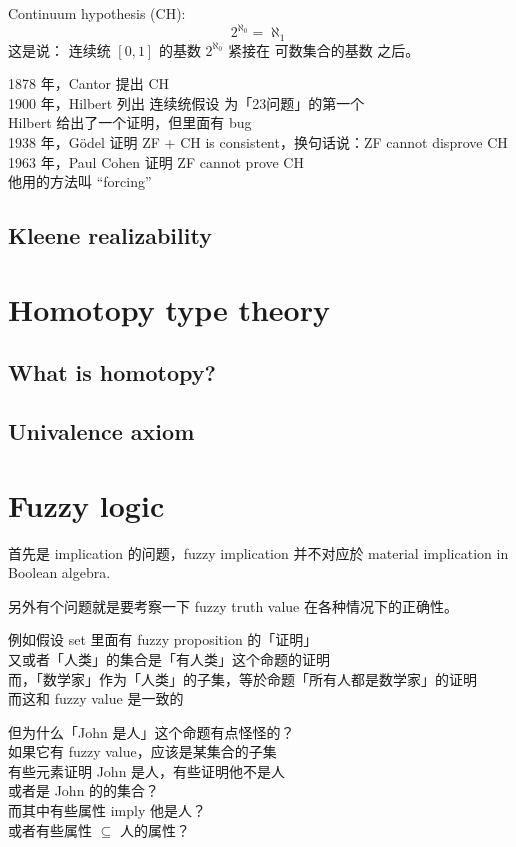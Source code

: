 Continuum hypothesis (CH):
\begin{equation}
2^{\aleph_0} = \aleph_1
\end{equation}
这是说： 连续统 $[0,1]$ 的基数 $2^{\aleph_0}$ 紧接在 可数集合的基数 之后。

1878 年，Cantor 提出 CH \\
1900 年，Hilbert 列出 连续统假设 为「23问题」的第一个 \\
\tab Hilbert 给出了一个证明，但里面有 bug \\
1938 年，G\"{o}del 证明 ZF + CH is consistent，换句话说：ZF cannot disprove CH \\
1963 年，Paul Cohen 证明 ZF cannot prove CH \\
\tab 他用的方法叫 ``forcing''

\subsection{Kleene realizability}

\section{Homotopy type theory}

\subsection{What is homotopy?}

\subsection{Univalence axiom}

\section{Fuzzy logic}

首先是 implication 的问题，fuzzy implication 并不对应於 material implication in Boolean algebra.

另外有个问题就是要考察一下 fuzzy truth value 在各种情况下的正确性。 

例如假设 set 里面有 fuzzy proposition 的「证明」\\
又或者「人类」的集合是「有人类」这个命题的证明 \\
而，「数学家」作为「人类」的子集，等於命题「所有人都是数学家」的证明 \\
而这和 fuzzy value 是一致的

但为什么「John 是人」这个命题有点怪怪的？ \\
如果它有 fuzzy value，应该是某集合的子集 \\
有些元素证明 John 是人，有些证明他不是人 \\
或者是 John 的的集合？ \\
而其中有些属性 imply 他是人？ \\
或者有些属性 $\subseteq$ 人的属性？

